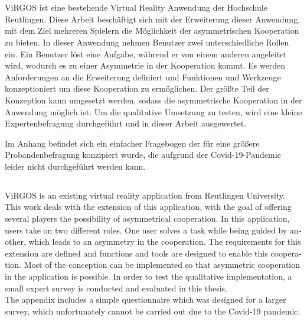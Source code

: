 ﻿\documentclass[12pt,oneside,a4paper]{article}
\begin{document}
\large


\section*{}
ViRGOS ist eine bestehende Virtual Reality Anwendung der Hochschule Reutlingen. Diese Arbeit beschäftigt sich mit der Erweiterung dieser Anwendung, mit dem Ziel mehreren Spielern die Möglichkeit der asymmetrischen Kooperation zu bieten. In dieser Anwendung nehmen Benutzer zwei unterschiedliche Rollen ein. Ein Benutzer löst eine Aufgabe, während er von einem anderen angeleitet wird, wodurch es zu einer Asymmetrie in der K­ooperation kommt. Es werden Anforderungen an die Erweiterung definiert und Funktionen und Werkzeuge konzeptioniert um diese Kooperation zu ermöglichen. Der größte Teil der Konzeption kann umgesetzt werden, sodass die asymmetrische Kooperation in der Anwendung möglich ist. Um die qualitative Umsetzung zu testen, wird eine kleine Expertenbefragung durchgeführt und in dieser Arbeit ausgewertet.\\ 

Im Anhang befindet sich ein einfacher Fragebogen der für eine größere Probandenbefragung konzipiert wurde, die aufgrund der Covid-19-Pandemie leider nicht durchgeführt werden kann.

\begin{otherlanguage}{english}
\section*{}
ViRGOS is an existing virtual reality application from Reutlingen University. This work deals with the extension of this application, with the goal of offering several players the possibility of asymmetrical cooperation. In this application, users take on two different roles. One user solves a task while being guided by another, which leads to an asymmetry in the cooperation. The requirements for this extension are defined and functions and tools are designed to enable this cooperation. Most of the conception can be implemented so that asymmetric cooperation in the application is possible. In order to test the qualitative implementation, a small expert survey is conducted and evaluated in this thesis.\\

The appendix includes a simple questionnaire which was designed for a larger survey, which unfortunately cannot be carried out due to the Covid-19 pandemic.
\end{otherlanguage}
\end{document}
